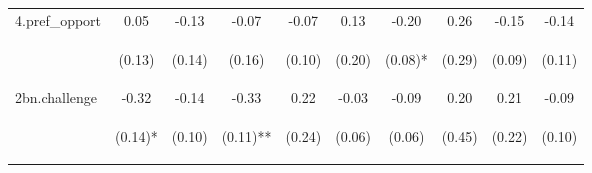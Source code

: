 \begin{center}
\begin{tabular}{lccccccccc}
\noalign{\smallskip}4.pref_opport & 0.05 & -0.13 & -0.07 & -0.07 & 0.13 & -0.20 & 0.26 & -0.15 & -0.14\\
 & \begin{footnotesize}(0.13)\end{footnotesize} & \begin{footnotesize}(0.14)\end{footnotesize} & \begin{footnotesize}(0.16)\end{footnotesize} & \begin{footnotesize}(0.10)\end{footnotesize} & \begin{footnotesize}(0.20)\end{footnotesize} & \begin{footnotesize}(0.08)*\end{footnotesize} & \begin{footnotesize}(0.29)\end{footnotesize} & \begin{footnotesize}(0.09)\end{footnotesize} & \begin{footnotesize}(0.11)\end{footnotesize}\\
\noalign{\smallskip}2bn.challenge & -0.32 & -0.14 & -0.33 & 0.22 & -0.03 & -0.09 & 0.20 & 0.21 & -0.09\\
 & \begin{footnotesize}(0.14)*\end{footnotesize} & \begin{footnotesize}(0.10)\end{footnotesize} & \begin{footnotesize}(0.11)**\end{footnotesize} & \begin{footnotesize}(0.24)\end{footnotesize} & \begin{footnotesize}(0.06)\end{footnotesize} & \begin{footnotesize}(0.06)\end{footnotesize} & \begin{footnotesize}(0.45)\end{footnotesize} & \begin{footnotesize}(0.22)\end{footnotesize} & \begin{footnotesize}(0.10)\end{footnotesize}\\

\end{tabular}
\end{center}

